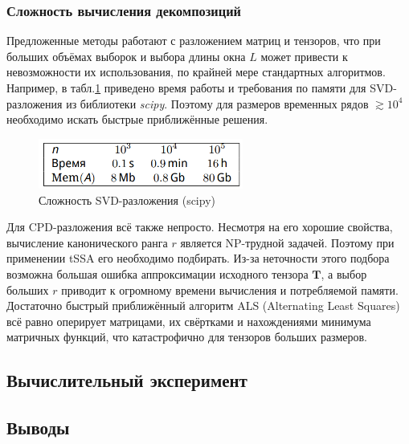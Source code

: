 			 	\subsubsection*{Сложность вычисления декомпозиций}
			 	
			 		Предложенные методы работают с разложением матриц и тензоров, что при больших объёмах выборок и выбора длины окна $ L $ может привести к невозможности их использования, по крайней мере стандартных алгоритмов. Например, в табл.\ref{tab:svd_time}  приведено время работы и требования по памяти для SVD-разложения из библиотеки \textit{scipy}. Поэтому для размеров временных рядов $ \gtrsim 10^4 $ необходимо искать быстрые приближённые решения.
			 		
			 		\begin{figure}[h]
			 			\centering
			 			\caption{Сложность SVD-разложения (scipy)}\label{tab:svd_time}
			 			\includegraphics[width=0.6\textwidth, keepaspectratio]{../figs/svd_time.png}
			 		\end{figure}
			 		
			 		Для CPD-разложения всё также непросто. Несмотря на его хорошие свойства, вычисление канонического ранга $ r $ является NP-трудной задачей. Поэтому при  применении tSSA его необходимо подбирать. Из-за неточности этого подбора возможна большая ошибка аппроксимации исходного тензора $ \mathbf{T} $, а выбор больших $ r $ приводит к огромному времени вычисления и потребляемой памяти. Достаточно быстрый приближённый алгоритм ALS (Alternating Least Squares) всё равно оперирует матрицами, их свёртками и нахождениями минимума матричных функций, что катастрофично для тензоров больших размеров.
			 
			 \subsection*{Вычислительный эксперимент}
			 
			 
			 \subsection*{Выводы}
			
			
		
		\newpage
		\printbibliography
	
